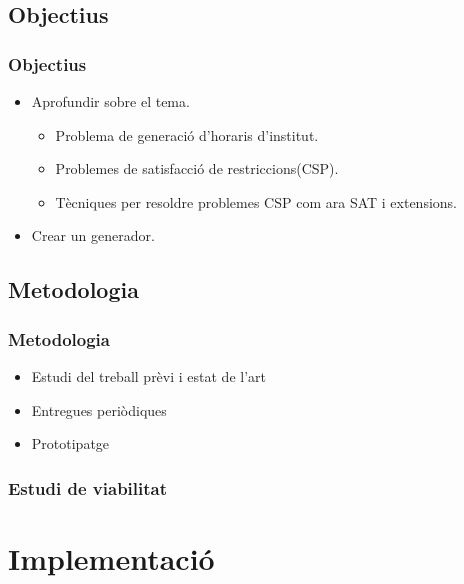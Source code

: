 \documentclass[11pt]{beamer}
\begin{document}
  \subsection{Objectius}

  \begin{frame}
    \frametitle{Objectius}

    \begin{itemize}
    
      \item Aprofundir sobre el tema.
       \begin{itemize}
        \item Problema de generació d'horaris d'institut.
        \item Problemes de satisfacció de restriccions(CSP).
        \item Tècniques per resoldre problemes CSP com ara SAT i extensions.
       \end{itemize}
      \item Crear un generador.
    
    \end{itemize}
          
  \end{frame}
  
  \subsection{Metodologia}
  \begin{frame}
    \frametitle{Metodologia}
    \begin{itemize}
      \item Estudi del treball prèvi i estat de l'art
      \item Entregues periòdiques
      \item Prototipatge
    \end{itemize}

  \end{frame}

  \begin{frame}
    \frametitle{Estudi de viabilitat}

  \end{frame}

  \section{Implementació}
  
\end{document}
